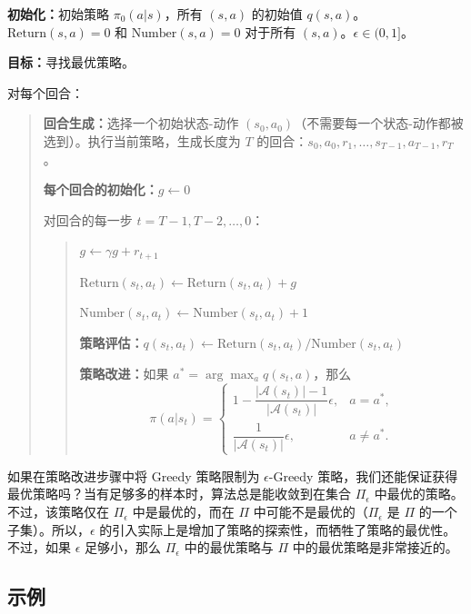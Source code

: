 \begin{algo}
\label{alg:rl-mc-epsilon-greedy}
\textbf{初始化：}初始策略 $\pi_{0}(a|s)$，所有 $(s,a)$ 的初始值 $q(s,a)$。$\mathrm{Return}(s,a) = 0$ 和 $\mathrm{Number}(s,a) = 0$ 对于所有 $(s,a)$。$\epsilon \in (0,1]$。

\textbf{目标：}寻找最优策略。

\medskip
对每个回合：
\begin{quote}
\textbf{回合生成：}选择一个初始状态-动作 $(s_{0}, a_{0})$（不需要每一个状态-动作都被选到）。执行当前策略，生成长度为 $T$ 的回合：$s_{0}, a_{0}, r_{1}, \ldots, s_{T-1}, a_{T-1}, r_{T}$。

\textbf{每个回合的初始化：}$g \leftarrow 0$

对回合的每一步 $t = T-1, T-2, \ldots, 0$：
\begin{quote}
$g \leftarrow \gamma g + r_{t+1}$

$\mathrm{Return}(s_{t}, a_{t}) \leftarrow \mathrm{Return}(s_{t}, a_{t}) + g$

$\mathrm{Number}(s_{t}, a_{t}) \leftarrow \mathrm{Number}(s_{t}, a_{t}) + 1$

\textbf{策略评估：}$q(s_{t}, a_{t}) \leftarrow \mathrm{Return}(s_{t}, a_{t}) / \mathrm{Number}(s_{t}, a_{t})$

\textbf{策略改进：}如果 $a^{*} = \arg\max_{a} q(s_{t}, a)$，那么
\[
\pi(a|s_{t}) = \begin{cases}
1 - \dfrac{|\mathcal{A}(s_{t})| - 1}{|\mathcal{A}(s_{t})|}\epsilon, & a = a^{*}, \\[2ex]
\dfrac{1}{|\mathcal{A}(s_{t})|}\epsilon, & a \neq a^{*}.
\end{cases}
\]
\end{quote}
\end{quote}
\end{algo}

如果在策略改进步骤中将 Greedy 策略限制为 $\epsilon$-Greedy 策略，我们还能保证获得最优策略吗？当有足够多的样本时，算法总是能收敛到在集合 $\varPi_{\epsilon}$ 中最优的策略。不过，该策略仅在 $\varPi_{\epsilon}$ 中是最优的，而在 $\varPi$ 中可能不是最优的（$\varPi_{\epsilon}$ 是 $\varPi$ 的一个子集）。所以，$\epsilon$ 的引入实际上是增加了策略的探索性，而牺牲了策略的最优性。不过，如果 $\epsilon$ 足够小，那么 $\varPi_{\epsilon}$ 中的最优策略与 $\varPi$ 中的最优策略是非常接近的。

\subsection{示例}
\label{sec:rl-mc-epsilon-greedy-example}

